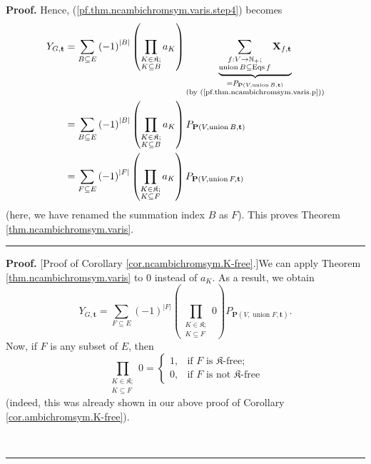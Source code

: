 \documentclass[numbers=enddot,12pt,final,onecolumn,notitlepage]{scrartcl}%
\theoremstyle{definition}
\newenvironment{proof}[1][Proof]{\noindent\textbf{#1.} }{\ \rule{0.5em}{0.5em}}
\newenvironment{verlong}{}{}
\let\sumnonlimits\sum
\let\prodnonlimits\prod
\renewcommand{\sum}{\sumnonlimits\limits}
\renewcommand{\prod}{\prodnonlimits\limits}
\begin{document}
\begin{verlong}
\begin{proof}
Hence, (\ref{pf.thm.ncambichromsym.varis.step4}) becomes%
\begin{align*}
Y_{G,\mathbf{t}}  &  =\sum_{B\subseteq E}\left(  -1\right)  ^{\left\vert
B\right\vert }\left(  \prod_{\substack{K\in\mathfrak{K};\\K\subseteq B}%
}a_{K}\right)  \underbrace{\sum_{\substack{f:V\rightarrow\mathbb{N}%
_{+};\\\operatorname*{union}B\subseteq\operatorname*{Eqs}f}}\mathbf{X}%
_{f,\mathbf{t}}}_{\substack{=P_{\mathbf{P}\left(  V,\operatorname*{union}%
B,\mathbf{t}\right)  }\\\text{(by (\ref{pf.thm.ncambichromsym.varis.p}))}}}\\
&  =\sum_{B\subseteq E}\left(  -1\right)  ^{\left\vert B\right\vert }\left(
\prod_{\substack{K\in\mathfrak{K};\\K\subseteq B}}a_{K}\right)  P_{\mathbf{P}%
\left(  V,\operatorname*{union}B,\mathbf{t}\right)  }\\
&  =\sum_{F\subseteq E}\left(  -1\right)  ^{\left\vert F\right\vert }\left(
\prod_{\substack{K\in\mathfrak{K};\\K\subseteq F}}a_{K}\right)  P_{\mathbf{P}%
\left(  V,\operatorname*{union}F,\mathbf{t}\right)  }%
\end{align*}
(here, we have renamed the summation index $B$ as $F$). This proves Theorem
\ref{thm.ncambichromsym.varis}.
\end{proof}

\begin{proof}
[Proof of Corollary \ref{cor.ncambichromsym.K-free}.]We can apply Theorem
\ref{thm.ncambichromsym.varis} to $0$ instead of $a_{K}$. As a result, we
obtain%
\begin{equation}
Y_{G,\mathbf{t}}=\sum_{F\subseteq E}\left(  -1\right)  ^{\left\vert
F\right\vert }\left(  \prod_{\substack{K\in\mathfrak{K};\\K\subseteq
F}}0\right)  P_{\mathbf{P}\left(  V,\operatorname*{union}F,\mathbf{t}\right)
}. \label{pf.cor.ncambichromsym.K-free.0}%
\end{equation}
Now, if $F$ is any subset of $E$, then%
\begin{equation}
\prod_{\substack{K\in\mathfrak{K};\\K\subseteq F}}0=%
\begin{cases}
1, & \text{if }F\text{ is }\mathfrak{K}\text{-free;}\\
0, & \text{if }F\text{ is not }\mathfrak{K}\text{-free}%
\end{cases}
\label{pf.cor.ncambichromsym.K-free.1}%
\end{equation}
(indeed, this was already shown in our above proof of Corollary
\ref{cor.ambichromsym.K-free}).


\end{proof}
\end{verlong}
\end{document}
